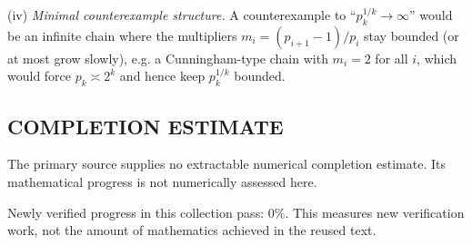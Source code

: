 (iv) \emph{Minimal counterexample structure.} A counterexample to “$p_k^{1/k}\to\infty$” would be an infinite chain where the multipliers $m_i=(p_{i+1}-1)/p_i$ stay bounded (or at most grow slowly), e.g. a Cunningham-type chain with $m_i=2$ for all $i$, which would force $p_k\asymp 2^k$ and hence keep $p_k^{1/k}$ bounded.



\subsection*{COMPLETION ESTIMATE}
The primary source supplies no extractable numerical completion estimate. Its mathematical progress is not numerically assessed here.

Newly verified progress in this collection pass: $0\%$. This measures new verification work, not the amount of mathematics achieved in the reused text.
